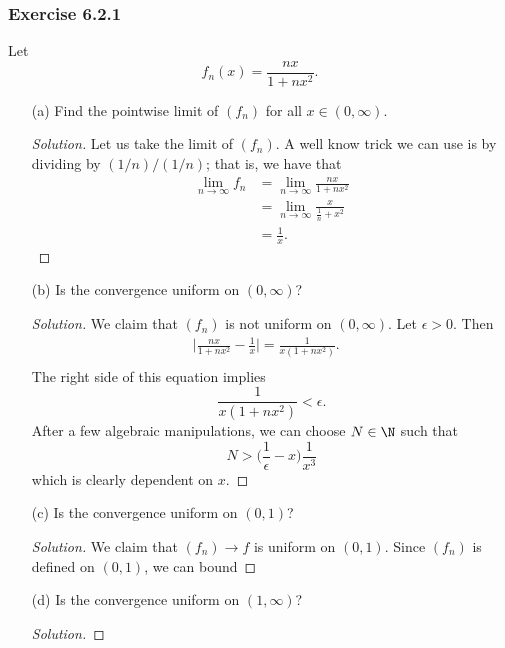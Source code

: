 \subsubsection{Exercise 6.2.1} Let 
\[  f_n(x) = \frac{ nx }{ 1 + nx^2  }. \]
\begin{enumerate}
    \item[(a)] Find the pointwise limit of \( (f_n)  \) for all \( x \in (0, \infty ) \).
        \begin{proof}[Solution]
        Let us take the limit of \( (f_n)  \). A well know trick we can use is by dividing by \( (1/n) / (1/n)  \); that is, we have that
        \begin{align*}
            \lim_{ n \to \infty  } f_n &= \lim_{ n \to \infty  } \frac{ nx  }{  1 + nx^2  }  \\
                                       &= \lim_{ n \to \infty  } \frac{ x  }{ \frac{ 1 }{ n } + x^2  } \\
                                       &= \frac{ 1 }{ x  }.
        \end{align*}
        \end{proof}
    \item[(b)] Is the convergence uniform on \( (0,\infty)  \)?
        \begin{proof}[Solution]
        We claim that \( (f_n)  \) is not uniform on \( (0, \infty ) \). Let \( \epsilon > 0  \). Then 
        \begin{align*}
            \Big| \frac{ nx }{ 1 + nx^2  } -  \frac{ 1 }{ x }  \Big| = \frac{ 1  }{ x(1+nx^2 ) }.  &\\
        \end{align*}
        The right side of this equation implies 
        \[  \frac{ 1 }{ x(1+nx^2)  } < \epsilon. \]
        After a few algebraic manipulations, we can choose \( N \in \N  \) such that 
        \[  N > \Big( \frac{ 1 }{ \epsilon  } - x  \Big) \frac{ 1 }{ x^3  }  \]
        which is clearly dependent on \( x  \). 
        \end{proof}
    \item[(c)] Is the convergence uniform on \( (0,1)  \)? 
        \begin{proof}[Solution]
        We claim that \( (f_n) \to f  \) is uniform on \( (0,1)  \). Since \( (f_n)  \) is defined on \( (0,1)  \), we can bound 
        \end{proof}
    \item[(d)] Is the convergence uniform on \( (1,\infty ) \)?
        \begin{proof}[Solution]
        
        \end{proof}
\end{enumerate}













